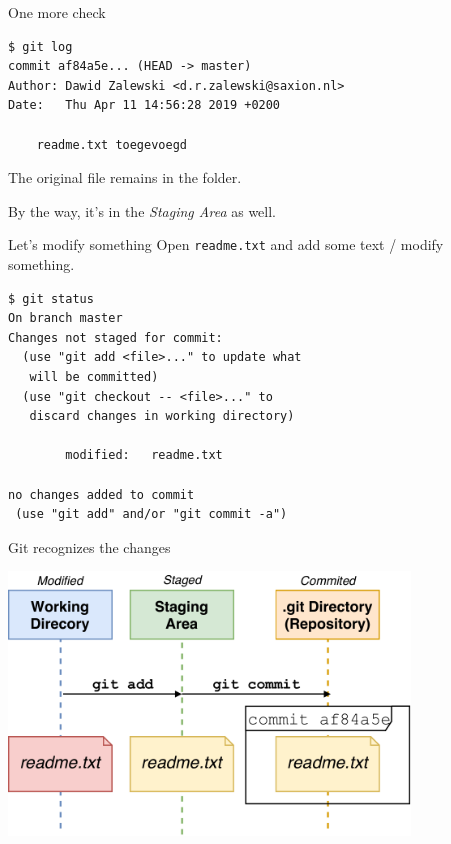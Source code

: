 \documentclass[
  11pt,
  american,
  ignorenonframetext,
  aspectratio=43,
  compress,
  xcolor=dvipsnames]{beamer}
\begin{document}
\begin{frame}[fragile]{One more check}
\protect\hypertarget{one-more-check}{}
\begin{verbatim}
$ git log
commit af84a5e... (HEAD -> master)
Author: Dawid Zalewski <d.r.zalewski@saxion.nl>
Date:   Thu Apr 11 14:56:28 2019 +0200

    readme.txt toegevoegd
\end{verbatim}

The original file remains in the folder.

By the way, it's in the \emph{Staging Area} as well.
\end{frame}

\begin{frame}[fragile]{Let's modify something}
\protect\hypertarget{lets-modify-something}{}
Open \texttt{readme.txt} and add some text / modify something.

\begin{verbatim}
$ git status
On branch master
Changes not staged for commit:
  (use "git add <file>..." to update what
   will be committed)
  (use "git checkout -- <file>..." to
   discard changes in working directory)

        modified:   readme.txt

no changes added to commit 
 (use "git add" and/or "git commit -a")
\end{verbatim}
\end{frame}

\begin{frame}{Git recognizes the changes}
\protect\hypertarget{git-recognizes-the-changes}{}
\begin{center}
\includegraphics[width=0.8\textwidth]{./images/git_workflow_changes.pdf}
\end{center}
\end{frame}
\end{document}
